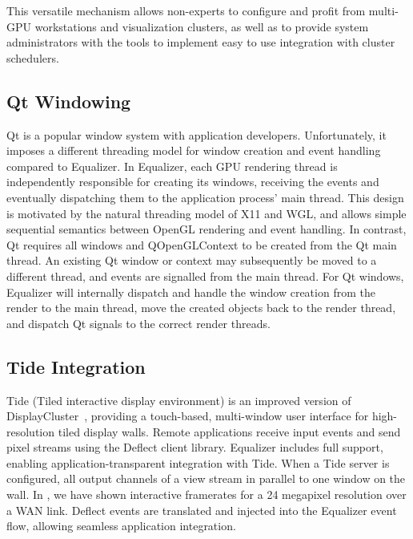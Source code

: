 \documentclass[10pt,journal,compsoc]{IEEEtran}
\begin{document}
This versatile mechanism allows non-experts to configure and profit from
multi-GPU workstations and visualization clusters, as well as to provide system
administrators with the tools to implement easy to use integration with cluster
schedulers.

\subsection{Qt Windowing}

Qt is a popular window system with application developers. Unfortunately, it
imposes a different threading model for window creation and event handling
compared to \textsf{Equalizer}. In \textsf{Equalizer}, each GPU rendering thread
is independently responsible for creating its windows, receiving the events and
eventually dispatching them to the application process' main thread. This design
is motivated by the natural threading model of X11 and WGL, and allows simple
sequential semantics between OpenGL rendering and event handling. In contrast,
Qt requires all windows and QOpenGLContext to be created from the Qt main
thread. An existing Qt window or context may subsequently be moved to a
different thread, and events are signalled from the main thread. For Qt windows,
Equalizer will internally dispatch and handle the window creation from the
render to the main thread, move the created objects back to the render thread,
and dispatch Qt signals to the correct render threads.

\subsection{Tide Integration}

\textsf{Tide} (Tiled interactive display environment) is an improved version of
\textsf{DisplayCluster}~\cite{DC}, providing a touch-based, multi-window user
interface for high-resolution tiled display walls. Remote applications receive
input events and send pixel streams using the \textsf{Deflect} client library.
\textsf{Equalizer} includes full support, enabling application-transparent
integration with \textsf{Tide}. When a \textsf{Tide} server is configured, all
output channels of a view stream in parallel to one window on the wall. In
\cite{deflect}, we have shown interactive framerates for a 24 megapixel
resolution over a WAN link. \textsf{Deflect} events are translated and injected
into the \textsf{Equalizer} event flow, allowing seamless application
integration.
\end{document}
